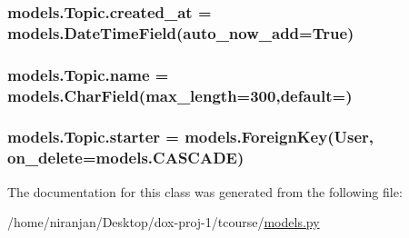 \subsubsection[{\texorpdfstring{created\+\_\+at}{created_at}}]{\setlength{\rightskip}{0pt plus 5cm}models.\+Topic.\+created\+\_\+at = models.\+Date\+Time\+Field(auto\+\_\+now\+\_\+add=True)\hspace{0.3cm}{\ttfamily [static]}}\hypertarget{classmodels_1_1_topic_a18646db3f9d9db5f01907841d02b08b0}{}\label{classmodels_1_1_topic_a18646db3f9d9db5f01907841d02b08b0}
\subsubsection[{\texorpdfstring{name}{name}}]{\setlength{\rightskip}{0pt plus 5cm}models.\+Topic.\+name = models.\+Char\+Field(max\+\_\+length=300,default=\textquotesingle{}\textquotesingle{})\hspace{0.3cm}{\ttfamily [static]}}\hypertarget{classmodels_1_1_topic_acd7ecf27aa6c6ec4aeb1a1e2884a9f43}{}\label{classmodels_1_1_topic_acd7ecf27aa6c6ec4aeb1a1e2884a9f43}
\subsubsection[{\texorpdfstring{starter}{starter}}]{\setlength{\rightskip}{0pt plus 5cm}models.\+Topic.\+starter = models.\+Foreign\+Key(User, on\+\_\+delete=models.\+C\+A\+S\+C\+A\+DE)\hspace{0.3cm}{\ttfamily [static]}}\hypertarget{classmodels_1_1_topic_a1ae6fd4bdbc0bde3b0da3f648a839616}{}\label{classmodels_1_1_topic_a1ae6fd4bdbc0bde3b0da3f648a839616}


The documentation for this class was generated from the following file\+:\begin{DoxyCompactItemize}
\item 
/home/niranjan/\+Desktop/dox-\/proj-\/1/tcourse/\hyperlink{models_8py}{models.\+py}\end{DoxyCompactItemize}
